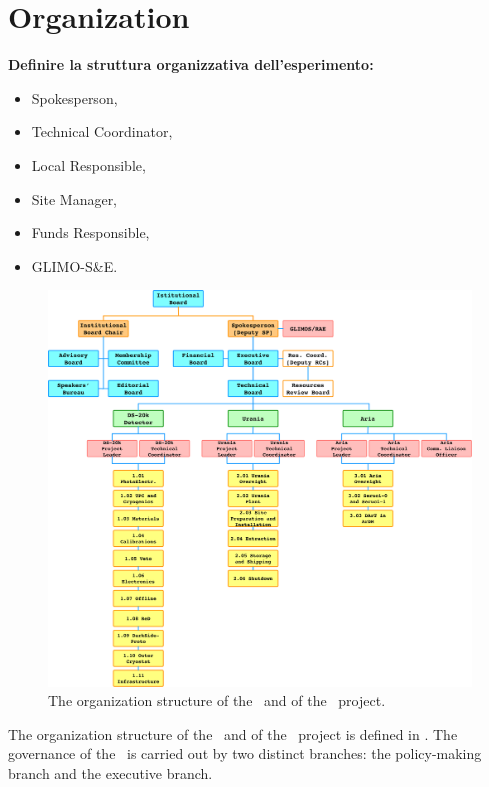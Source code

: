 \section{Organization}
\label{sec:Organization}

{\bf \color{red} Definire la struttura organizzativa dell’esperimento:
\begin{itemize}
\item Spokesperson, 
\item Technical Coordinator,
\item Local Responsible,
\item Site Manager,
\item Funds Responsible,
\item GLIMO-S\&E.
\end{itemize}
}


\begin{figure}[htbp!]
\includegraphics[width=\textwidth]{./Figures/ManagementChart.pdf}
\caption[The organization structure of the \GADMC\ and of the \DS\ project]{The organization structure of the \GADMC\ and of the \DS\ project.}
\label{fig:ManagementChart}
\end{figure}

The organization structure of the \GADMC\ and of the \DS\ project is defined in . The governance of the \GADMC\ is carried out by two distinct branches: the policy-making branch and the executive branch.

